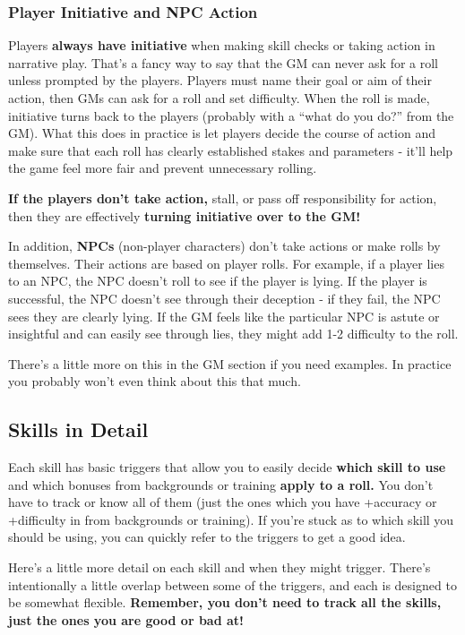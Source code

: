 \subsubsection{Player Initiative and NPC Action}

Players \textbf{always have initiative} when making skill checks or taking action in narrative play. That's a fancy way to say that the GM can never ask for a roll unless prompted by the players. Players must name their goal or aim of their action, then GMs can ask for a roll and set difficulty. When the roll is made, initiative turns back to the players (probably with a ``what do you do?'' from the GM). What this does in practice is let players decide the course of action and make sure that each roll has clearly established stakes and parameters - it'll help the game feel more fair and prevent unnecessary rolling. 

\textbf{If the players don't take action,} stall, or pass off responsibility for action, then they are effectively \textbf{turning initiative over to the GM!} 

In addition, \textbf{NPCs} (non-player characters) don't take actions or make rolls by themselves. Their actions are based on player rolls. For example, if a player lies to an NPC, the NPC doesn't roll to see if the player is lying. If the player is successful, the NPC doesn't see through their deception - if they fail, the NPC sees they are clearly lying. If the GM feels like the particular NPC is astute or insightful and can easily see through lies, they might add 1-2 difficulty to the roll.

There's a little more on this in the GM section if you need examples. In practice you probably won't even think about this that much.

\subsection{Skills in Detail}

Each skill has basic triggers that allow you to easily decide \textbf{which skill to use} and which bonuses from backgrounds or training \textbf{apply to a roll.} You don't have to track or know all of them (just the ones which you have +accuracy or +difficulty in from backgrounds or training). If you're stuck as to which skill you should be using, you can quickly refer to the triggers to get a good idea. 

Here's a little more detail on each skill and when they might trigger. There's intentionally a little overlap between some of the triggers, and each is designed to be somewhat flexible. \textbf{Remember, you don't need to track all the skills, just the ones you are good or bad at!} 

